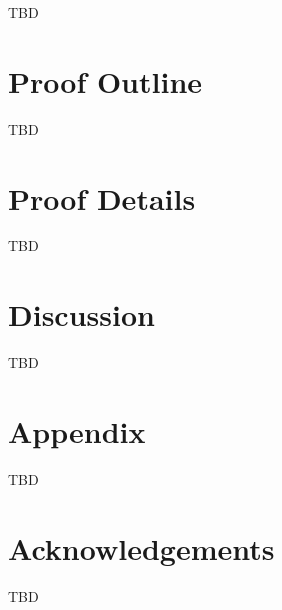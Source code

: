 \documentclass[11pt]{article}
\theoremstyle{definition}
\theoremstyle{plain}
\begin{document}
TBD

\section{Proof Outline}

TBD

\section{Proof Details}

TBD

\section{Discussion}

TBD

\appendix

\section{Appendix}
\label{sec:appendix}

TBD

\section*{Acknowledgements}

TBD



\end{document}
